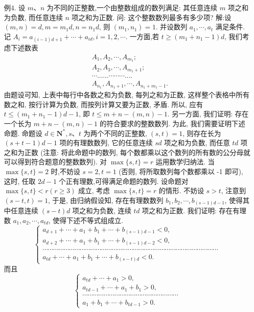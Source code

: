 例4. 设 $m 、 n$ 为不同的正整数,一个由整数组成的数列满足: 其任意连续 $m$ 项之和为负数, 而任意连续 $n$ 项之和为正数.
问: 这个整数数列最多有多少项?
解:设 $(m, n)=d, m=m_1 d, n=n_1 d$, 则 $\left(m_1, n_1\right)=1$. 并设数列 $a_1, \cdots, a_t$ 满足条件.
记 $A_i=a_{(i-1) d+1}+\cdots+a_{i d}, i=1,2, \cdots$.
一方面,若 $t \geqslant\left(m_1+n_1-1\right) d$, 我们考虑下述数表
$$
\begin{aligned}
& A_1, A_2, \cdots, A_{m_1} ; \\
& A_2, A_3, \cdots, A_{m_1+1} ; \\
& \cdots \ldots . . . \cdots \cdots \cdots . . . . \\
& A_{n_1}, A_{n_1+1}, \cdots, A_{n_1+m_1-1} .
\end{aligned}
$$
由题设可知, 上表中每行中各数之和为负数, 每列之和为正数, 这样整个表格中所有数之和, 按行计算为负数, 而按列计算又要为正数, 矛盾.
所以, 应有 $t \leqslant\left(m_1+n_1-1\right) d-1$, 即 $t \leqslant m+n-(m, n)-1$.
另一方面, 我们证明: 存在一个长为 $m+n-(m, n)-1$ 的符合要求的整数数列.
为此, 我们需要证明下述命题.
命题设 $d \in \mathbf{N}^*, s 、 t$ 为两个不同的正整数, $(s, t)=1$, 则存在长为 $(s+ t-1) d-1$ 项的有理数数列, 它的任意连续 $s d$ 项之和为负数, 而任意 $t d$ 项之和为正数 (注意: 将此命题中的数列, 每个数都乘以这个数列的所有数的公分母就可以得到符合题意的整数数列).
对 $\max \{s, t\}=r$ 运用数学归纳法.
当 $\max \{s, t\}=2$ 时,不妨设 $s=2, t=1$ (否则, 将所取数列每个数都乘以 -1 即可), 这时, 任取 $2 d-1$ 个正有理数,可得满足命题的数列.
设命题对 $\max \{s, t\}<r(r \geqslant 3)$ 成立, 考虑 $\max \{s, t\}=r$ 的情形.
不妨设 $s>t$, 注意到 $(s-t, t)=1$, 于是, 由归纳假设知, 存在有理数数列 $b_1, b_2, \cdots, b_{(s-1) d-1}$, 使得其中任意连续 $(s-t) d$ 项之和为负数, 连续 $t d$ 项之和为正数.
我们证明: 存在有理数 $a_1, a_2, \cdots, a_{t d}$, 使得下述不等式组成立.
$$
\left\{\begin{array}{l}a_{d+1}+\cdots+a_1+b_1+\cdots+b_{(s-1) d-1}<0, \\ a_{d+2}+\cdots+a_1+b_1+\cdots+b_{(s-1) d-2}<0, \\ \cdots \cdots \cdots \cdots \cdots \cdots \cdots \cdots \cdots \cdots \cdots \cdots \cdots \cdots \cdots \cdots \cdots \cdots \cdots \cdots \cdots \cdots \cdots \cdots \cdots \cdots \cdots \cdots \cdots \cdots \cdots \cdots \cdots \\ a_{t d}+\cdots+a_1+b_1+\cdots+b_{(s-t) d}<0 .\end{array}\right. \label{eq1}
$$
而且
$$
\left\{\begin{array}{l}
a_{t d}+\cdots+a_1>0, \\
a_{t d-1}+\cdots+a_1+b_1>0, \\
\cdots \cdots \cdots \cdots \cdots \cdots \cdots \cdots \cdots \cdots \cdots \cdots \cdots \cdots \cdots \cdots \cdots \cdots \\
a_1+b_1+\cdots+b_{t d-1}>0 .
\end{array}\right. \label{eq2}
$$
